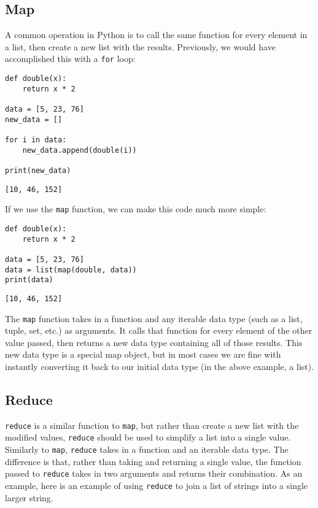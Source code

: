 \documentclass[11pt]{cselabheader}
\begin{document}
\subsection{Map}
\label{subsec:map}
A common operation in Python is to call the same function for every element in a list, then create a new list with the results. Previously, we would have accomplished this with a \lstinline{for} loop:

\begin{lstlisting}[style=python]
def double(x):
    return x * 2

data = [5, 23, 76]
new_data = []

for i in data:
    new_data.append(double(i))

print(new_data)
\end{lstlisting}

\begin{lstlisting}[style=bash]
[10, 46, 152]
\end{lstlisting}

If we use the \lstinline{map} function, we can make this code much more simple:

\begin{lstlisting}[style=python]
def double(x):
    return x * 2

data = [5, 23, 76]
data = list(map(double, data))
print(data)
\end{lstlisting}

\begin{lstlisting}[style=bash]
[10, 46, 152]
\end{lstlisting}

The \lstinline{map} function takes in a function and any iterable data type (such as a list, tuple, set, etc.) as arguments. It calls that function for every element of the other value passed, then returns a new data type containing all of those results. This new data type is a special map object, but in most cases we are fine with instantly converting it back to our initial data type (in the above example, a list).


\subsection{Reduce}
\label{subsec:reduce}
\lstinline{reduce} is a similar function to \lstinline{map}, but rather than create a new list with the modified values, \lstinline{reduce} should be used to simplify a list into a single value. Similarly to \lstinline{map}, \lstinline{reduce} takes in a function and an iterable data type. The difference is that, rather than taking and returning a single value, the function passed to \lstinline{reduce} takes in two arguments and returns their combination. As an example, here is an example of using \lstinline{reduce} to join a list of strings into a single larger string.
\end{document}
